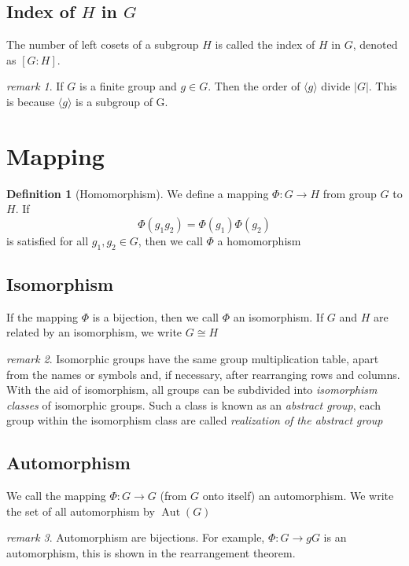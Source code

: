 \documentclass{amsart}
\theoremstyle{remark}
\newtheorem*{remark}{remark}
\theoremstyle{remark}
\theoremstyle{definition}
\newtheorem*{definition}{Definition}
\DeclareMathOperator{\Aut}{Aut}
\begin{document}
\subsection*{Index of $H$ in $G$}
    The number of left cosets of a subgroup $H$ is called the index of $H$ in $G$, denoted as $[G:H]$.
\begin{remark}
    If $G$ is a finite group and $g\in G$. Then the order of $\langle g\rangle$ divide $|G|$. This is because 
    $\langle g\rangle$ is a subgroup of G.
\end{remark}

\vspace{10pt}
\section*{Mapping}

\begin{definition}[Homomorphism]
    We define a mapping $\Phi\colon G \to H$ from group $G$ to $H$. If
    \[
        \Phi(g_1 g_2) = \Phi(g_1) \Phi(g_2)    
    \] 
    is satisfied for all $g_1, g_2 \in G$, then we call $\Phi$ a homomorphism
\end{definition}

\subsection*{Isomorphism}
    If the mapping $\Phi$ is a bijection, then we call $\Phi$ an isomorphism. If $G$ and $H$ are related by 
    an isomorphism, we write $G\cong H$

\begin{remark}
    Isomorphic groups have the same group multiplication table, apart from the names or symbols and, if necessary, after 
    rearranging rows and columns. 
    With the aid of isomorphism, all groups can be subdivided into \emph{isomorphism classes} of isomorphic groups. 
    Such a class is known as an \emph{abstract group}, each group within the isomorphism class are called 
    \emph{realization of the abstract group}
\end{remark}

\subsection*{Automorphism}
    We call the mapping $\Phi\colon G \to G$ (from $G$ onto itself) an automorphism. We write the set of all automorphism by $\Aut(G)$ 
\begin{remark}
Automorphism are bijections. For example, $\Phi\colon G \to gG$ is an automorphism, 
this is shown in the rearrangement theorem. 
\end{remark}
\end{document}
